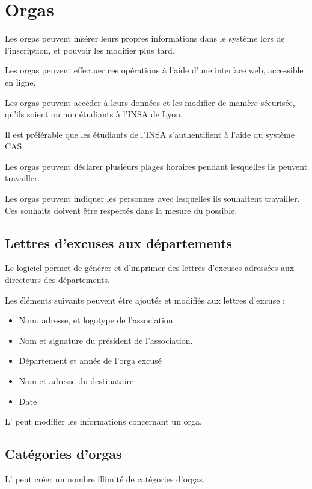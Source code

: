 
\section{Orgas}



Les orgas peuvent insérer leurs propres informations dans le système lors de l'inscription, et pouvoir les modifier plus tard.

Les orgas peuvent effectuer ces opérations à l'aide d'une interface web, accessible en ligne.

Les orgas peuvent accéder à leurs données et les modifier de manière sécurisée, qu'ils soient ou non étudiants à l'INSA de Lyon.

Il est préférable que les étudiants de l'INSA s'authentifient à l'aide du système CAS.

Les orgas peuvent déclarer plusieurs plages horaires pendant lesquelles ils peuvent travailler.

Les orgas peuvent indiquer les personnes avec lesquelles ils souhaitent travailler. Ces souhaits doivent être respectés dans la mesure du possible.

\subsection{Lettres d'excuses aux départements}
Le logiciel permet de générer et d'imprimer des lettres d'excuses adressées aux directeurs des départements.

Les éléments suivants peuvent être ajoutés et modifiés aux lettres d'excuse : 
\begin{itemize}
 \item Nom, adresse, et logotype de l'association
\item Nom et signature du président de l'association.
\item Département et année de l'orga excusé
\item Nom et adresse du destinataire
\item Date
\end{itemize}


L' \oh{} peut modifier les informations concernant un orga.


\subsection{Catégories d'orgas}
L'\oh{} peut créer un nombre illimité de catégories d'orgas.

